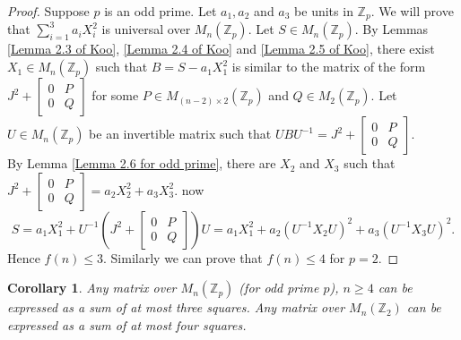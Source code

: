 \documentclass[12pt,a4paper]{article}
\newtheorem{cor}{Corollary}[section]
\begin{document}
	\begin{proof}
		Suppose $p$ is an odd prime. Let $a_1,a_2$ and $a_3$ be units in $\mathbb{Z}_p$. We will prove that $\sum_{i=1}^{3} a_iX_i^2$ is universal over $M_n(\mathbb{Z}_p)$. Let $S \in M_n(\mathbb{Z}_p)$. By Lemmas \ref{Lemma 2.3 of Koo}, \ref{Lemma 2.4 of Koo} and \ref{Lemma 2.5 of Koo}, there exist $X_1 \in M_n(\mathbb{Z}_p)$ such that $B= S- a_1X_1^2$ is similar to the matrix of the form $J^2 + \begin{bmatrix}
			0 & P\\
			0 & Q
		\end{bmatrix}$ for some $P \in M_{(n-2) \times 2}(\mathbb{Z}_p)$ and $Q \in M_2(\mathbb{Z}_p)$. Let $U \in M_n(\mathbb{Z}_p)$ be an invertible matrix such that $UBU^{-1} = J^2 + \begin{bmatrix}
		0 & P\\
		0 & Q
		\end{bmatrix}$.\\
		
		By Lemma \ref{Lemma 2.6 for odd prime}, there are $X_2$ and $X_3$ such that $J^2 + \begin{bmatrix}
			0 & P \\
			0 & Q
		\end{bmatrix} = a_2X_2^2 + a_3X_3^2$.
		now
		\begin{equation*}
			S= a_1X_1^2 + U^{-1}(J^2 + \begin{bmatrix}
				0 & P\\
				0 & Q
			\end{bmatrix})U = a_1X_1^2 + a_2 \left(U^{-1}X_2 U\right)^2 + a_3 (U^{-1}X_3 U)^2.
		\end{equation*}
		Hence $f(n) \leq 3$. Similarly we can prove that $f(n) \leq 4$ for $p=2$.
	\end{proof}
	\begin{cor}
		Any matrix over $M_n(\mathbb{Z}_p)$ (for odd prime $p$), $n \geq 4 $ can be expressed as a sum of at most three squares. Any matrix over $M_n(\mathbb{Z}_2)$ can be expressed as a sum of at most four squares.
	\end{cor}
	
	
\end{document}
